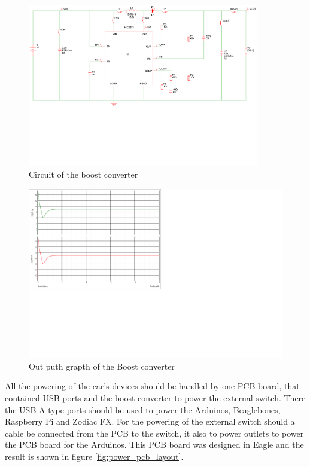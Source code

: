 \documentclass[11pt, titlepage]{article} %
\begin{document}
\begin{figure}
	\includegraphics[width=0.9\textwidth]{boost_converter_curcuit.pdf}
	\caption{Circuit of the boost converter}
	\label{fig:circuit_boost_converter}
\end{figure}

\begin{figure}
	\includegraphics{graph_of_boost_out.png}
	\caption{Out puth grapth of the Boost converter}
	\label{fig:graph_boost}
\end{figure}

All the powering of the car's devices should be handled by one PCB board, that contained USB ports and the boost converter to power the external switch. There the USB-A type ports should be used to power the Arduinos, Beaglebones, Raspberry Pi and Zodiac FX. For the powering of the external switch should a cable be connected from the PCB to the switch, it also to power outlets to power the PCB board for the Arduinos. This PCB board was designed in Eagle and the result is shown in figure \ref{fig:power_pcb_layout}. 
\end{document}
